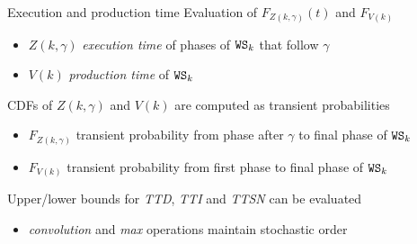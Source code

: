     \begin{frame}{Execution and production time}
      Evaluation of $F_{Z(k,\gamma)}(t)$ and $F_{V(k)}$
      \begin{itemize}
        \item $Z(k,\gamma)$ \textit{execution time} of phases of $\mathtt{WS}_k$ that follow $\gamma$
        \item $V(k)$ \textit{production time} of $\mathtt{WS}_k$
      \end{itemize}
    
      \vspace{1em}
      CDFs of $Z(k,\gamma)$ and $V(k)$ are computed as transient probabilities
      
      \begin{itemize}
        \item $F_{Z(k,\gamma)}$ transient probability from phase after $\gamma$ to final phase of $\mathtt{WS}_k$
        \item $F_{V(k)}$ transient probability from first phase to final phase of $\mathtt{WS}_k$
      \end{itemize}
      
      \vspace{2em}
      Upper/lower bounds for \textit{TTD}, \textit{TTI} and \textit{TTSN} can be evaluated
      \begin{itemize}
        \item \textit{convolution} and \textit{max} operations maintain stochastic order
      \end{itemize}
    \end{frame}
    
